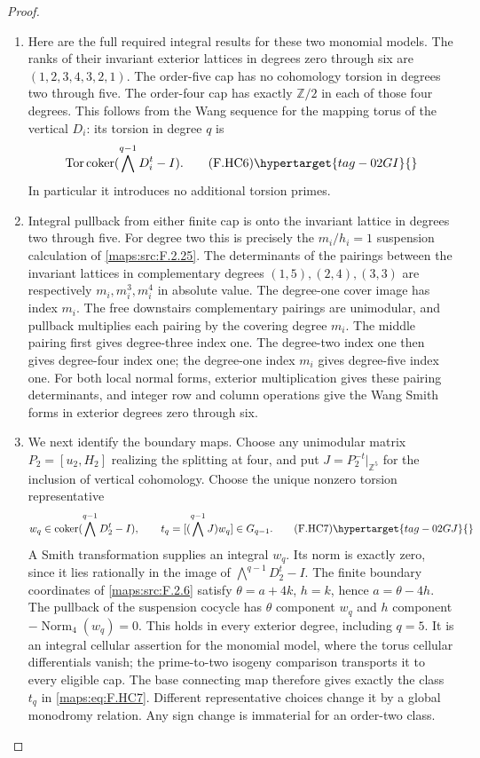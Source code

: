 \begin{proof}
\begin{enumerate}[label={$\langle1\rangle$\arabic*.}]
\item Here are the full required integral results for these
two monomial models.
The ranks of their invariant exterior lattices in
degrees zero through six are
$(1,2,3,4,3,2,1)$.
The order-five cap has no cohomology torsion in degrees
two through five.
The order-four cap has exactly $\mathbb Z/2$ in each
of those four degrees.
This follows from the Wang sequence for the mapping
torus of the vertical $D_i$:
its torsion in degree $q$ is
\[
 \operatorname{Tor}\operatorname{coker}
       (\bigwedge^{q-1}D_i^t-I).
 \tag{F.HC6}\hypertarget{tag-02GI}{}\label{maps:eq:F.HC6}
\]
In particular it introduces no additional torsion primes.

\item Integral pullback from either finite cap is onto the
invariant lattice in degrees two through five.
For degree two this is precisely the $m_i/h_i=1$
suspension calculation of \ref{maps:src:F.2.25}.
The determinants of the pairings between
the invariant lattices in complementary degrees
$(1,5),(2,4),(3,3)$ are respectively
$m_i,m_i^3,m_i^4$ in absolute value.
The degree-one cover image has index $m_i$.
The free downstairs complementary pairings are unimodular,
and pullback multiplies each pairing by the covering
degree $m_i$.
The middle pairing first gives degree-three index one.
The degree-two index one then gives degree-four index one;
the degree-one index $m_i$ gives degree-five index one.
For both local normal forms, exterior multiplication gives these
pairing determinants, and integer row and column operations give the
Wang Smith forms in exterior degrees zero through six.

\item We next identify the boundary maps.
Choose any unimodular matrix $P_2=[u_2,H_2]$ realizing
the splitting at four, and put
$J=P_2^{-t}|_{\mathbb Z^5}$ for the inclusion of vertical
cohomology.
Choose the unique nonzero torsion representative
\[
 w_q\in\operatorname{coker}
            (\bigwedge^{q-1}D_2^t-I),\qquad
 t_q=[(\bigwedge^{q-1}J)w_q]\in G_{q-1}.
 \tag{F.HC7}\hypertarget{tag-02GJ}{}\label{maps:eq:F.HC7}
\]
A Smith transformation supplies an integral $w_q$.
Its norm is exactly zero, since it lies rationally in
the image of $\bigwedge^{q-1}D_2^t-I$.
The finite boundary coordinates of \ref{maps:src:F.2.6} satisfy
$\theta=a+4k$, $h=k$, hence $a=\theta-4h$.
The pullback of the suspension cocycle has $\theta$
component $w_q$ and $h$ component
$-\operatorname{Norm}_4(w_q)=0$.
This holds in every exterior degree, including $q=5$.
It is an integral cellular assertion for the monomial
model, where the torus cellular differentials vanish;
the prime-to-two isogeny comparison transports it to
every eligible cap.
The base connecting map therefore gives exactly the
class $t_q$ in \eqref{maps:eq:F.HC7}.
Different representative choices change it by a global
monodromy relation.  Any sign change is immaterial for
an order-two class.


\end{enumerate}
\end{proof}
